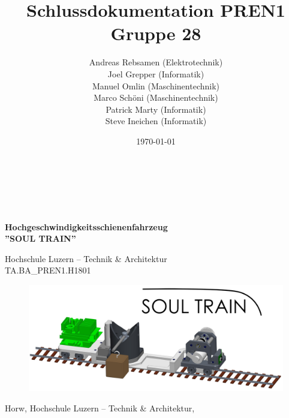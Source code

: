 \documentclass[11pt]{scrartcl}
\title{Schlussdokumentation PREN1 Gruppe 28}
\author{Andreas Rebsamen (Elektrotechnik) \\Joel Grepper (Informatik)\\ Manuel Omlin (Maschinentechnik)\\ Marco Schöni (Maschinentechnik)\\ Patrick Marty (Informatik)\\ Steve Ineichen (Informatik)}
\date{\today{}}
\begin{document}
        \begin{titlingpage}
            \begin{flushleft}
                \begin{Huge} %
                    \textbf{\thetitle} \\
                \end{Huge}
                \vspace{1.5cm}
                \begin{large} %
                    \theauthor \\
                \end{large}
                \vspace{1.5cm}
                \begin{huge}
                    \textbf{Hochgeschwindigkeitsschienenfahrzeug}\\
                    \textbf{''SOUL TRAIN''}\\
                \end{huge}
                \vspace{0.5cm}
                \begin{large}
                    Hochschule Luzern – Technik \& Architektur\\
                    TA.BA{\_}PREN1.H1801
                \end{large}
                \vspace{1.5cm}
                \begin{figure}[H] %
                    \centering
                    \includegraphics[width=1\textwidth]{images/soultrain.png}
                \end{figure}
                \vspace{3cm}
                \begin{large} %
                    Horw, Hochschule Luzern – Technik \& Architektur, \thedate
                \end{large}
            \end{flushleft}
        \end{titlingpage}
\end{document}

